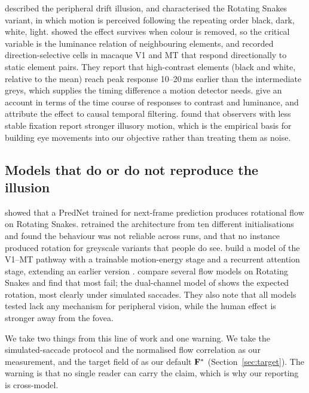 \citet{faubert1999peripheral} described the peripheral drift illusion, and
\citet{kitaoka2003snakes} characterised the Rotating Snakes variant, in which
motion is perceived following the repeating order black, dark, white, light.
\citet{conway2005neural} showed the effect survives when colour is removed, so
the critical variable is the luminance relation of neighbouring elements, and
recorded direction-selective cells in macaque V1 and MT that respond
directionally to static element pairs. They report that high-contrast elements
(black and white, relative to the mean) reach peak response 10--20\,ms earlier
than the intermediate greys, which supplies the timing difference a motion
detector needs. \citet{backus2005illusory} give an account in terms of the
time course of responses to contrast and luminance, and
\citet{fermuller2010causal} attribute the effect to causal temporal filtering.
\citet{murakami2006fixation} found that observers with less stable fixation
report stronger illusory motion, which is the empirical basis for building eye
movements into our objective rather than treating them as noise.

\subsection{Models that do or do not reproduce the illusion}

\citet{watanabe2018prednet} showed that a PredNet \cite{lotter2017prednet}
trained for next-frame prediction produces rotational flow on Rotating Snakes.
\citet{kirubeswaran2023inconsistent} retrained the architecture from ten
different initialisations and found the behaviour was not reliable across runs,
and that no instance produced rotation for greyscale variants that people do
see. \citet{sun2025multiorder} build a model of the V1--MT pathway with a
trainable motion-energy stage and a recurrent attention stage, extending an
earlier version \cite{sun2023motionenergy}. \citet{rosario2026illusory} compare
several flow models on Rotating Snakes and find that most fail; the
dual-channel model of \citet{sun2025multiorder} shows the expected rotation,
most clearly under simulated saccades. They also note that all models tested
lack any mechanism for peripheral vision, while the human effect is stronger
away from the fovea.

We take two things from this line of work and one warning. We take the
simulated-saccade protocol and the normalised flow correlation as our
measurement, and the target field of \citet{rosario2026illusory} as our
default $\mathbf{F}^\ast$ (Section~\ref{sec:target}). The warning is that no single
reader can carry the claim, which is why our reporting is cross-model.

